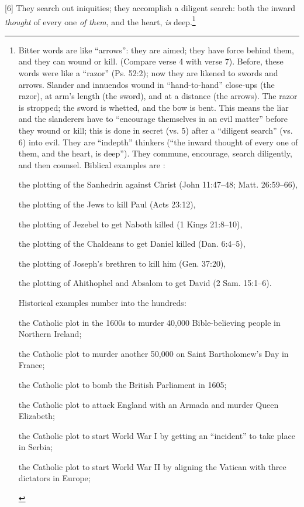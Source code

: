 [6] \textcolor[rgb]{0.00,0.00,1.00}{They search out iniquities; they accomplish a diligent search: both the inward \emph{thought} of every one \emph{of} \emph{them}, and the heart, \emph{is} deep.}\footnote{Bitter words are like “arrows”: they are aimed; they have force behind them, and they can wound or kill. (Compare verse 4 with verse 7). Before, these words were like a “razor” (Ps. 52:2); now they are likened to swords and arrows. Slander and innuendos wound in “hand-to-hand” close-ups (the razor), at arm’s length (the sword), and at a distance (the arrows). The razor is stropped; the sword is whetted, and the bow is bent. This means the liar and the slanderers have to “encourage themselves in an evil matter” before they wound or kill; this is done in secret (vs. 5) after a “diligent search” (vs. 6) into evil. They are “indepth” thinkers (“the inward thought of every one of them, and the heart, is deep”). They commune, encourage, search diligently, and then counsel. Biblical examples are \cite{Ruckman1992Psalms}:
\begin{compactenum}
\item the plotting of the Sanhedrin against Christ (John 11:47--48; Matt. 26:59--66), 
\item the plotting of the Jews to kill Paul (Acts 23:12), 
\item the plotting of Jezebel to get Naboth killed (1 Kings 21:8--10), 
\item the plotting of the Chaldeans to get Daniel killed (Dan. 6:4--5), 
\item the plotting of Joseph’s brethren to kill him (Gen. 37:20), 
\item  the plotting of Ahithophel and Absalom to get David (2 Sam. 15:1--6).  
\end{compactenum}
Historical examples number into the hundreds: 
\begin{compactenum}
\item  the Catholic plot in the 1600s to murder 40,000 Bible-believing people in Northern Ireland; 
\item  the Catholic plot to murder another 50,000 on Saint Bartholomew’s Day in France; 
\item  the Catholic plot to bomb the British Parliament in 1605; 
\item  the Catholic plot to attack England with an Armada and murder Queen Elizabeth; 
\item  the Catholic plot to start World War I by getting an “incident” to take place in Serbia; 
\item  the Catholic plot to start World War II by aligning the Vatican with three dictators in Europe; 

\end{compactenum}}
